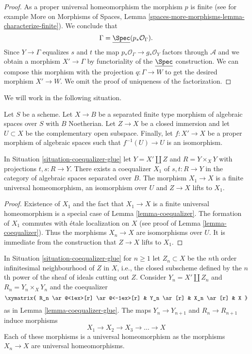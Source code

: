 \begin{proof}
\medskip\noindent
As a proper universal homeomorphism the morphism $p$ is finite
(see for example More on Morphisms of Spaces, Lemma
\ref{spaces-more-morphisms-lemma-characterize-finite}).
We conclude that
$$
\Gamma = \underline{\Spec}(p_*\mathcal{O}_\Gamma).
$$
Since $Y \to \Gamma$ equalizes $s$ and $t$ the map
$p_*\mathcal{O}_\Gamma \to g_*\mathcal{O}_Y$ factors through
$\mathcal{A}$ and we obtain a morphism
$X' \to \Gamma$ by functoriality of the $\underline{\Spec}$ construction.
We can compose this morphism with the projection
$q : \Gamma \to W$ to get the desired morphism $X' \to W$.
We omit the proof of uniqueness of the factorization.
\end{proof}

\noindent
We will work in the following situation.

\begin{situation}
\label{situation-coequalizer-glue}
Let $S$ be a scheme. Let $X \to B$ be a separated finite type morphism of
algebraic spaces over $S$ with $B$ Noetherian. Let
$Z \to X$ be a closed immersion and let $U \subset X$ be the complementary
open subspace. Finally, let $f : X' \to X$ be a proper morphism of algebraic
spaces such that $f^{-1}(U) \to U$ is an isomorphism.
\end{situation}

\begin{lemma}
\label{lemma-coequalizer-glue}
In Situation \ref{situation-coequalizer-glue} let
$Y = X' \amalg Z$ and $R = Y \times_X Y$ with projections $t, s : R \to Y$.
There exists a coequalizer $X_1$ of $s, t : R \to Y$ in the category
of algebraic spaces separated over $B$. The morphism
$X_1 \to X$ is a finite universal homeomorphism, an isomorphism
over $U$ and $Z \to X$ lifts to $X_1$.
\end{lemma}

\begin{proof}
Existence of $X_1$ and the fact that $X_1 \to X$ is a finite
universal homeomorphism is a special case of Lemma \ref{lemma-coequalizer}.
The formation of $X_1$ commutes with \'etale localization on $X$
(see proof of Lemma \ref{lemma-coequalizer}).
Thus the morphisms $X_n \to X$ are isomorphisms over $U$.
It is immediate from the construction that $Z \to X$ lifts to $X_1$.
\end{proof}

\noindent
In Situation \ref{situation-coequalizer-glue} for $n \geq 1$ let
$Z_n \subset X$ be the $n$th order infinitesimal neighbourhood
of $Z$ in $X$, i.e., the closed subscheme defined by the $n$th
power of the sheaf of ideals cutting out $Z$. Consider $Y_n = X' \amalg Z_n$
and $R_n = Y_n \times_X Y_n$ and the coequalizer
$$
\xymatrix{
R_n \ar@<1ex>[r] \ar@<-1ex>[r] & Y_n \ar[r] & X_n \ar[r] & X
}
$$
as in Lemma \ref{lemma-coequalizer-glue}. The maps $Y_n \to Y_{n + 1}$
and $R_n \to R_{n + 1}$ induce morphisms
\begin{equation}
\label{equation-system-coequalizers}
X_1 \to X_2 \to X_3 \to \ldots \to X
\end{equation}
Each of these morphisms is a universal homeomorphism as the morphisms
$X_n \to X$ are universal homeomorphisms.


